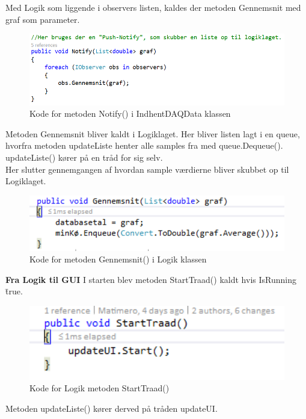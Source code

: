 Med Logik som liggende i observers listen, kaldes der metoden Gennemsnit med graf som parameter.

\begin{figure}[H]
	\centering
	\includegraphics[width=1.0\textwidth]{FigurerProgram/NotifyDaq}
	\caption{Kode for metoden Notify() i IndhentDAQData klassen}
\end{figure}

Metoden Gennemsnit bliver kaldt i Logiklaget. Her bliver listen lagt i en queue, hvorfra metoden updateListe henter alle samples fra med queue.Dequeue(). updateListe() kører på en tråd for sig selv.
\\Her slutter gennemgangen af hvordan sample værdierne bliver skubbet op til Logiklaget.

\begin{figure}[H]
	\centering
	\includegraphics[width=1.0\textwidth]{FigurerProgram/GennemsnitLogik}
	\caption{Kode for metoden Gennemsnit() i Logik klassen}
\end{figure}

\textbf{Fra Logik til GUI}
I starten blev metoden StartTraad() kaldt hvis IsRunning \= true.
\begin{figure}[H]
	\centering
	\includegraphics[width=1.0\textwidth]{FigurerProgram/StartTraad}
	\caption{Kode for Logik metoden StartTraad()}
\end{figure}

Metoden updateListe() kører derved på tråden updateUI.


